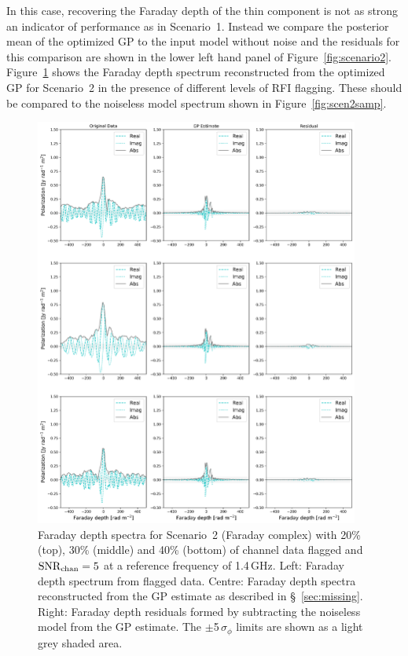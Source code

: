 \documentclass[fleqn,usenatbib]{mnras}
\begin{document}
In this case, recovering the Faraday depth of the thin component is not as strong an indicator of performance as in Scenario~1. Instead we compare the posterior mean of the optimized GP to the input model without noise and the residuals for this comparison are shown in the lower left hand panel of Figure~\ref{fig:scenario2}. Figure~\ref{fig:flagging2} shows the Faraday depth spectrum reconstructed from the optimized GP for Scenario~2 in the presence of different levels of RFI flagging. These should be compared to the noiseless model spectrum shown in Figure~\ref{fig:scen2samp}.
%
\begin{figure}
\centerline{\includegraphics[width=0.95\textwidth]{./FIGURES/figure7.png}}
\caption{\label{fig:flagging2} Faraday depth spectra for Scenario~2 (Faraday complex) with 20\% (top), 30\% (middle) and 40\% (bottom) of channel data flagged and ${\rm SNR}_{\rm chan} = 5$ at a reference frequency of 1.4\,GHz. Left: Faraday depth spectrum from flagged data. Centre: Faraday depth spectra reconstructed from the GP estimate as described in \S~\ref{sec:missing}. Right: Faraday depth residuals formed by subtracting the noiseless model from the GP estimate. The $\pm$5\,$\sigma_{\phi}$ limits are shown as a light grey shaded area.}
\end{figure}
\end{document}
